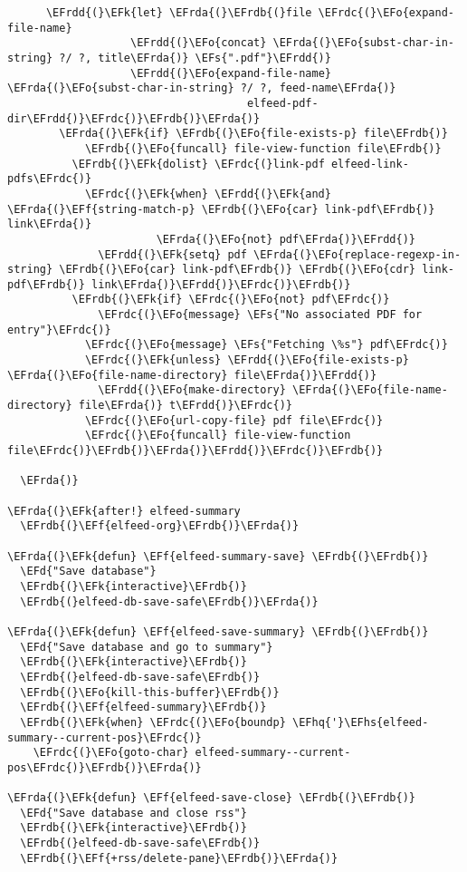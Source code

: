 \documentclass[a4wide,10pt]{article}
\newcommand{\EFs}[1]{\textcolor{EFs}{#1}} %
\newcommand{\EFd}[1]{\textcolor{EFd}{#1}} %
\newcommand{\EFk}[1]{\textcolor{EFk}{#1}} %
\newcommand{\EFf}[1]{\textcolor{EFf}{#1}} %
\newcommand{\EFo}[1]{\textcolor{EFo}{#1}} %
\newcommand{\EFhq}[1]{\textcolor{EFhq}{#1}} %
\newcommand{\EFhs}[1]{\textcolor{EFhs}{#1}} %
\newcommand{\EFrda}[1]{\textcolor{EFrda}{#1}} %
\newcommand{\EFrdb}[1]{\textcolor{EFrdb}{#1}} %
\newcommand{\EFrdc}[1]{\textcolor{EFrdc}{#1}} %
\newcommand{\EFrdd}[1]{\textcolor{EFrdd}{#1}} %
\begin{document}
\begin{Code}
\begin{Verbatim}
      \EFrdd{(}\EFk{let} \EFrda{(}\EFrdb{(}file \EFrdc{(}\EFo{expand-file-name}
                   \EFrdd{(}\EFo{concat} \EFrda{(}\EFo{subst-char-in-string} ?/ ?, title\EFrda{)} \EFs{".pdf"}\EFrdd{)}
                   \EFrdd{(}\EFo{expand-file-name} \EFrda{(}\EFo{subst-char-in-string} ?/ ?, feed-name\EFrda{)}
                                     elfeed-pdf-dir\EFrdd{)}\EFrdc{)}\EFrdb{)}\EFrda{)}
        \EFrda{(}\EFk{if} \EFrdb{(}\EFo{file-exists-p} file\EFrdb{)}
            \EFrdb{(}\EFo{funcall} file-view-function file\EFrdb{)}
          \EFrdb{(}\EFk{dolist} \EFrdc{(}link-pdf elfeed-link-pdfs\EFrdc{)}
            \EFrdc{(}\EFk{when} \EFrdd{(}\EFk{and} \EFrda{(}\EFf{string-match-p} \EFrdb{(}\EFo{car} link-pdf\EFrdb{)} link\EFrda{)}
                       \EFrda{(}\EFo{not} pdf\EFrda{)}\EFrdd{)}
              \EFrdd{(}\EFk{setq} pdf \EFrda{(}\EFo{replace-regexp-in-string} \EFrdb{(}\EFo{car} link-pdf\EFrdb{)} \EFrdb{(}\EFo{cdr} link-pdf\EFrdb{)} link\EFrda{)}\EFrdd{)}\EFrdc{)}\EFrdb{)}
          \EFrdb{(}\EFk{if} \EFrdc{(}\EFo{not} pdf\EFrdc{)}
              \EFrdc{(}\EFo{message} \EFs{"No associated PDF for entry"}\EFrdc{)}
            \EFrdc{(}\EFo{message} \EFs{"Fetching \%s"} pdf\EFrdc{)}
            \EFrdc{(}\EFk{unless} \EFrdd{(}\EFo{file-exists-p} \EFrda{(}\EFo{file-name-directory} file\EFrda{)}\EFrdd{)}
              \EFrdd{(}\EFo{make-directory} \EFrda{(}\EFo{file-name-directory} file\EFrda{)} t\EFrdd{)}\EFrdc{)}
            \EFrdc{(}\EFo{url-copy-file} pdf file\EFrdc{)}
            \EFrdc{(}\EFo{funcall} file-view-function file\EFrdc{)}\EFrdb{)}\EFrda{)}\EFrdd{)}\EFrdc{)}\EFrdb{)}

  \EFrda{)}

\EFrda{(}\EFk{after!} elfeed-summary
  \EFrdb{(}\EFf{elfeed-org}\EFrdb{)}\EFrda{)}

\EFrda{(}\EFk{defun} \EFf{elfeed-summary-save} \EFrdb{(}\EFrdb{)}
  \EFd{"Save database"}
  \EFrdb{(}\EFk{interactive}\EFrdb{)}
  \EFrdb{(}elfeed-db-save-safe\EFrdb{)}\EFrda{)}

\EFrda{(}\EFk{defun} \EFf{elfeed-save-summary} \EFrdb{(}\EFrdb{)}
  \EFd{"Save database and go to summary"}
  \EFrdb{(}\EFk{interactive}\EFrdb{)}
  \EFrdb{(}elfeed-db-save-safe\EFrdb{)}
  \EFrdb{(}\EFo{kill-this-buffer}\EFrdb{)}
  \EFrdb{(}\EFf{elfeed-summary}\EFrdb{)}
  \EFrdb{(}\EFk{when} \EFrdc{(}\EFo{boundp} \EFhq{'}\EFhs{elfeed-summary--current-pos}\EFrdc{)}
    \EFrdc{(}\EFo{goto-char} elfeed-summary--current-pos\EFrdc{)}\EFrdb{)}\EFrda{)}

\EFrda{(}\EFk{defun} \EFf{elfeed-save-close} \EFrdb{(}\EFrdb{)}
  \EFd{"Save database and close rss"}
  \EFrdb{(}\EFk{interactive}\EFrdb{)}
  \EFrdb{(}elfeed-db-save-safe\EFrdb{)}
  \EFrdb{(}\EFf{+rss/delete-pane}\EFrdb{)}\EFrda{)}


\end{Verbatim}
\end{Code}
\end{document}
